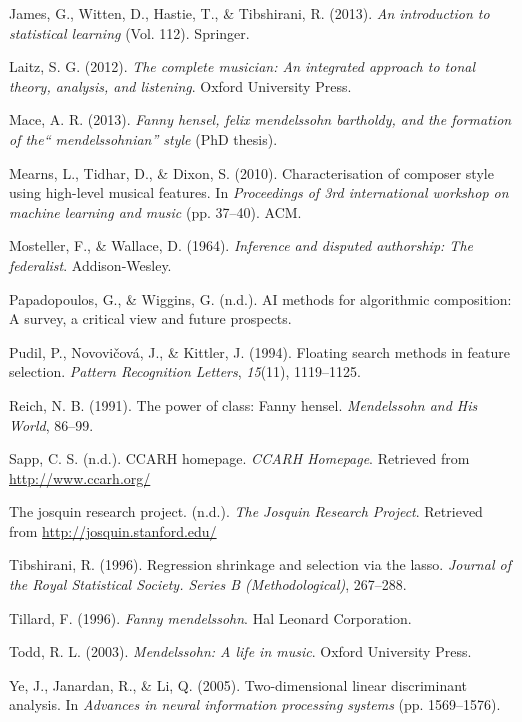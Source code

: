 \documentclass[12pt,twoside]{reedthesis}
\theoremstyle{definition}
\theoremstyle{definition}
\theoremstyle{definition}
\theoremstyle{remark}
\begin{document}
\hypertarget{ref-isl}{}
James, G., Witten, D., Hastie, T., \& Tibshirani, R. (2013). \emph{An
introduction to statistical learning} (Vol. 112). Springer.

\hypertarget{ref-laitz}{}
Laitz, S. G. (2012). \emph{The complete musician: An integrated approach
to tonal theory, analysis, and listening}. Oxford University Press.

\hypertarget{ref-mace2013}{}
Mace, A. R. (2013). \emph{Fanny hensel, felix mendelssohn bartholdy, and
the formation of the`` mendelssohnian'' style} (PhD thesis).

\hypertarget{ref-mearns2010}{}
Mearns, L., Tidhar, D., \& Dixon, S. (2010). Characterisation of
composer style using high-level musical features. In \emph{Proceedings
of 3rd international workshop on machine learning and music} (pp.
37--40). ACM.

\hypertarget{ref-mosteller1964inference}{}
Mosteller, F., \& Wallace, D. (1964). \emph{Inference and disputed
authorship: The federalist}. Addison-Wesley.

\hypertarget{ref-papadopoulosai}{}
Papadopoulos, G., \& Wiggins, G. (n.d.). AI methods for algorithmic
composition: A survey, a critical view and future prospects.

\hypertarget{ref-pudil1994floating}{}
Pudil, P., Novovičová, J., \& Kittler, J. (1994). Floating search
methods in feature selection. \emph{Pattern Recognition Letters},
\emph{15}(11), 1119--1125.

\hypertarget{ref-reich1991}{}
Reich, N. B. (1991). The power of class: Fanny hensel. \emph{Mendelssohn
and His World}, 86--99.

\hypertarget{ref-sapp}{}
Sapp, C. S. (n.d.). CCARH homepage. \emph{CCARH Homepage}. Retrieved
from \url{http://www.ccarh.org/}

\hypertarget{ref-jrp}{}
The josquin research project. (n.d.). \emph{The Josquin Research
Project}. Retrieved from \url{http://josquin.stanford.edu/}

\hypertarget{ref-lasso}{}
Tibshirani, R. (1996). Regression shrinkage and selection via the lasso.
\emph{Journal of the Royal Statistical Society. Series B
(Methodological)}, 267--288.

\hypertarget{ref-tillard1996}{}
Tillard, F. (1996). \emph{Fanny mendelssohn}. Hal Leonard Corporation.

\hypertarget{ref-todd2003}{}
Todd, R. L. (2003). \emph{Mendelssohn: A life in music}. Oxford
University Press.

\hypertarget{ref-ldadim}{}
Ye, J., Janardan, R., \& Li, Q. (2005). Two-dimensional linear
discriminant analysis. In \emph{Advances in neural information
processing systems} (pp. 1569--1576).


\end{document}
